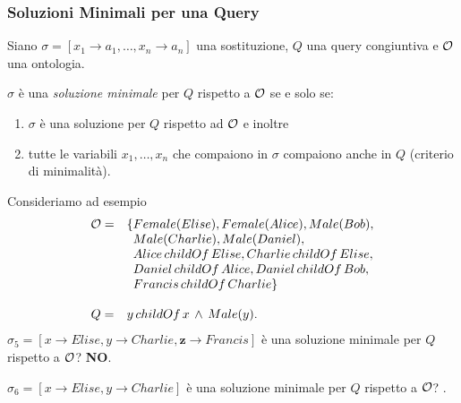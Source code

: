 \documentclass[8pt]{beamer}
\begin{document}
\begin{frame}
\frametitle{Soluzioni Minimali per una Query}
Siano $\sigma=[x_1 \rightarrow a_1, \ldots, x_n \rightarrow a_n]$ 
una sostituzione, $Q$ una query congiuntiva e $\mathcal{O}$ una ontologia.
\vspace{\baselineskip}

$\sigma$ \`e una \emph{soluzione minimale} per $Q$ rispetto a $\mathcal{O}$
se e solo se:
\begin{enumerate}
 \item $\sigma$ \`e una soluzione per $Q$ rispetto ad $\mathcal{O}$ e inoltre
 \item tutte le variabili $x_1, \ldots, x_n$ che compaiono in $\sigma$
 compaiono anche in $Q$ (criterio di minimalit\`a).
\end{enumerate}
Consideriamo ad esempio
\[
\begin{array}{cl}
  \Ont  =  &  \{Female(Elise), Female(Alice), Male(Bob), \\
  &\phantom{\{}Male(Charlie), Male(Daniel), \\
  &\phantom{\{}Alice\,childOf\,Elise, Charlie\,childOf\,Elise, \\
  &\phantom{\{}Daniel\,childOf\,Alice, Daniel\,childOf\,Bob, \\
  &\phantom{\{}Francis\,childOf\,Charlie \}\\
  &\\
  Q = & y\,childOf\,x\,\wedge\,Male(y) .
 \end{array}
\]
$\sigma_5=[x \rightarrow Elise, y \rightarrow Charlie, \mathbf{z} \rightarrow Francis]$ \`e una 
soluzione minimale per $Q$ rispetto a $\mathcal{O}$? \textbf{NO}.
\vspace{\baselineskip}

$\sigma_6=[x \rightarrow Elise, y \rightarrow Charlie]$ \`e una 
soluzione minimale per $Q$ rispetto a $\mathcal{O}$? .
\end{frame}
\end{document}
